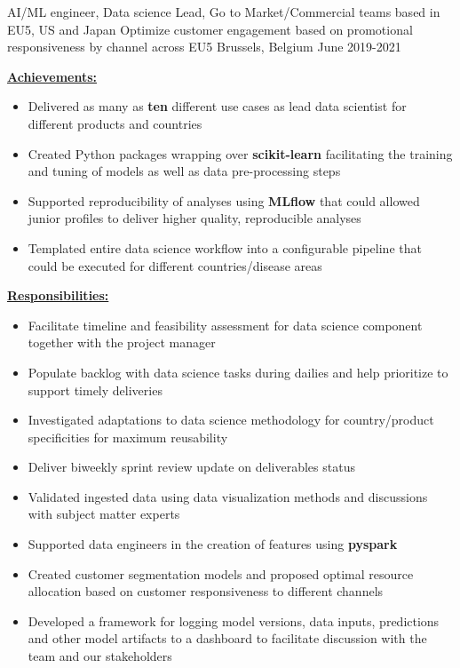\begin{cventries}
  \cventry
    {AI/ML engineer, Data science Lead, Go to Market/Commercial teams based in EU5, US and Japan} %
    {Optimize customer engagement based on promotional responsiveness by channel across EU5} %
    {Brussels, Belgium} %
    {June 2019-2021} %
    {
    \begin{cvitems}
         \item {\underline{\textbf{Achievements:}}}
            \begin{itemize}
                \item {Delivered as many as \textbf{ten} different use cases as lead data scientist for different products and countries}
                \item {Created Python packages wrapping over \textbf{scikit-learn} facilitating the training and tuning of models as well as data pre-processing steps}
                \item {Supported reproducibility of analyses using \textbf{MLflow} that could allowed junior profiles to deliver higher quality, reproducible analyses}
                \item {Templated entire data science workflow into a configurable pipeline that could be executed for different countries/disease areas}
        \end{itemize}
        \item {\underline{\textbf{Responsibilities:}}}
                 \begin{itemize}
                    \item {Facilitate timeline and feasibility assessment for data science component together with the project manager}
                    \item {Populate backlog with data science tasks during dailies and help prioritize to support timely deliveries}
                    \item {Investigated adaptations to data science methodology for country/product specificities for maximum reusability}
                    \item {Deliver biweekly sprint review update on deliverables status}
                    \item {Validated ingested data using data visualization methods and discussions with subject matter experts}
                    \item {Supported data engineers in the creation of features using \textbf{pyspark}}
                    \item {Created customer segmentation models and proposed optimal resource allocation based on customer responsiveness to different channels}
                    \item {Developed a framework for logging model versions, data inputs, predictions and other model artifacts to a dashboard to facilitate discussion with the team and our stakeholders}
                 \end{itemize}
    \end{cvitems}
    }
\vspace{2mm}


\end{cventries}
